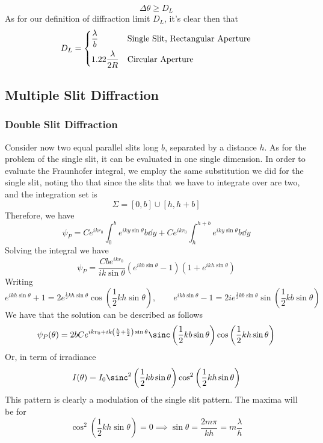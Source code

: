 \documentclass[../electromagnetism.tex]{subfiles}
\begin{document}
\begin{equation}
	\Delta\theta\ge D_L
	\label{eq:rayleighcriterion.fradiff}
\end{equation}
As for our definition of diffraction limit $D_L$, it's clear then that
\begin{equation}
	D_L=\begin{dcases}
		\frac{\lambda}{b}&\text{Single Slit, Rectangular Aperture}\\
		1.22\frac{\lambda}{2R}&\text{Circular Aperture}
	\end{dcases}
	\label{eq:diffractionlimit.fradiff}
\end{equation}
\subsection{Multiple Slit Diffraction}
\subsubsection{Double Slit Diffraction}
Consider now two equal parallel slits long $b$, separated by a distance $h$. As for the problem of the single slit, it can be evaluated in one single dimension. In order to evaluate the Fraunhofer integral, we employ the same substitution we did for the single slit, noting tho that since the slits that we have to integrate over are two, and the integration set is
\begin{equation*}
	\Sigma=[0, b]\cup[h, h+b]
\end{equation*}
Therefore, we have
\begin{equation}
	\psi_P=Ce^{ikr_0}\int_{0}^{b}e^{iky\sin\theta}b\dd^{}{y}+Ce^{ikr_0}\int_{h}^{h+b}e^{iky\sin\theta}b\dd^{}{y}
	\label{eq:doubleslitint.fradiff}
\end{equation}
Solving the integral we have
\begin{equation*}
	\psi_P=\frac{Cbe^{ikr_0}}{ik\sin\theta}\left( e^{ikb\sin\theta}-1 \right)\left( 1+e^{ikh\sin\theta} \right)
\end{equation*}
Writing
\begin{equation*}
	e^{ikh\sin\theta}+1=2e^{\frac{1}{2}kh\sin\theta}\cos\left( \frac{1}{2}kh\sin\theta \right),\qquad e^{ikb\sin\theta}-1=2ie^{\frac{1}{2}kb\sin\theta}\sin\left( \frac{1}{2}kb\sin\theta \right)
\end{equation*}
We have that the solution can be described as follows
\begin{equation}
	\psi_P(\theta)=2bCe^{ikr_0+ik\left( \frac{h}{2}+\frac{b}{2} \right)\sin\theta}\sinc\left( \frac{1}{2}kb\sin\theta \right)\cos\left( \frac{1}{2}kh\sin\theta \right)
	\label{eq:doubleslitpsi.fradiff}
\end{equation}
Or, in term of irradiance
\begin{equation}
	I(\theta)=I_0\sinc^2\left( \frac{1}{2}kb\sin\theta \right)\cos^2\left( \frac{1}{2}kh\sin\theta \right)
	\label{eq:patterndoubleslit.fradiff}
\end{equation}
This pattern is clearly a modulation of the single slit pattern. The maxima will be for
\begin{equation}
	\cos^2\left( \frac{1}{2}kh\sin\theta \right)=0\implies\sin\theta=\frac{2m\pi}{kh}=m\frac{\lambda}{h}
	\label{eq:maximads.fradiff}
\end{equation}
\end{document}

